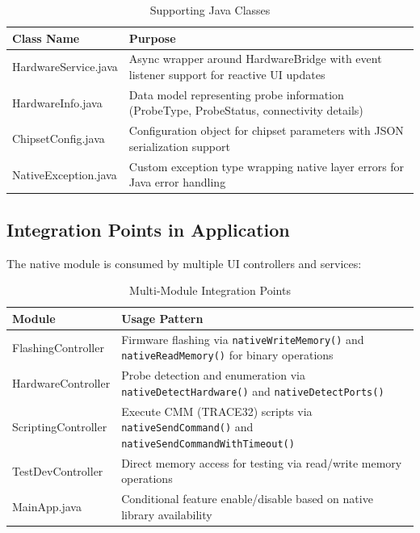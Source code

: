 \documentclass[12pt,a4paper]{article}
\begin{document}
\begin{table}[h]
\centering
\begin{tabular}{|p{3.5cm}|p{9cm}|}
\hline
\textbf{Class Name} & \textbf{Purpose} \\
\hline
HardwareService.java & Async wrapper around HardwareBridge with event listener support for reactive UI updates \\
\hline
HardwareInfo.java & Data model representing probe information (ProbeType, ProbeStatus, connectivity details) \\
\hline
ChipsetConfig.java & Configuration object for chipset parameters with JSON serialization support \\
\hline
NativeException.java & Custom exception type wrapping native layer errors for Java error handling \\
\hline
\end{tabular}
\caption{Supporting Java Classes}
\end{table}

\subsection{Integration Points in Application}

The native module is consumed by multiple UI controllers and services:

\begin{table}[h]
\centering
\begin{tabular}{|p{3cm}|p{9cm}|}
\hline
\textbf{Module} & \textbf{Usage Pattern} \\
\hline
FlashingController & Firmware flashing via \texttt{nativeWriteMemory()} and \texttt{nativeReadMemory()} for binary operations \\
\hline
HardwareController & Probe detection and enumeration via \texttt{nativeDetectHardware()} and \texttt{nativeDetectPorts()} \\
\hline
ScriptingController & Execute CMM (TRACE32) scripts via \texttt{nativeSendCommand()} and \texttt{nativeSendCommandWithTimeout()} \\
\hline
TestDevController & Direct memory access for testing via read/write memory operations \\
\hline
MainApp.java & Conditional feature enable/disable based on native library availability \\
\hline
\end{tabular}
\caption{Multi-Module Integration Points}
\end{table}
\end{document}

